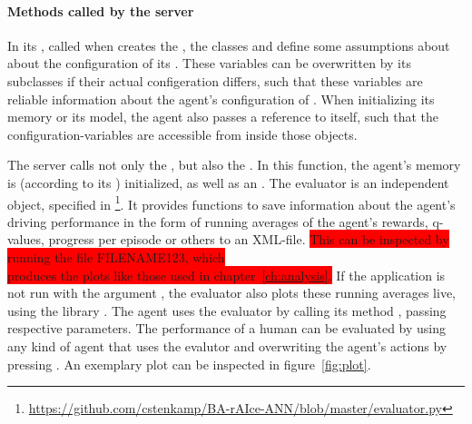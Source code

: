 \paragraph{Methods called by the server}

In its , called when  creates the , the classes  and  define some assumptions about about the configuration of its . These variables can be overwritten by its subclasses if their actual configeration differs, such that these variables are reliable information about the agent's configuration of . When initializing its memory or its model, the agent also passes a reference to itself, such that the configuration-variables are accessible from inside those objects. 

The server calls not only the , but also the . In this function, the agent's memory is (according to its ) initialized, as well as an . The evaluator is an independent object, specified in \footnote{\url{https://github.com/cstenkamp/BA-rAIce-ANN/blob/master/evaluator.py}}. It provides functions to save information about the agent's driving performance in the form of running averages of the agent's rewards, q-values, progress per episode or others to an XML-file. \colorbox{red}{This can be inspected by running the file FILENAME123, which \\ produces the plots like those used in chapter~\ref{ch:analysis}.} If the application is not run with the argument , the evaluator also plots these running averages live, using the library . The agent uses the evaluator by calling its method , passing respective parameters. The performance of a human can be evaluated by using any kind of agent that uses the evalutor and overwriting the agent's actions by pressing . An exemplary plot can be inspected in figure~\ref{fig:plot}.

